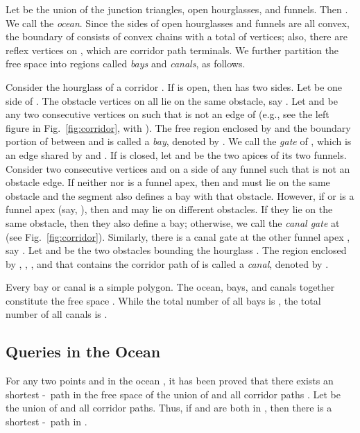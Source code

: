 \documentclass[english,runningheads,11pt]{llncs}
\def\st{-}
\begin{document}
Let  be the union of the  junction triangles, open
hourglasses, and funnels.  Then .
We call  the {\em ocean}.
Since the sides of open hourglasses and funnels
are all convex, the boundary
 of  consists of  convex chains with
a total of  vertices; also, there are  reflex vertices on ,
which are corridor path terminals.
We further partition the free space  into regions called {\em
bays} and {\em canals}, as follows.

Consider the hourglass  of a corridor .
If  is open, then 
has two sides. Let  be one side of .
The obstacle vertices on  all lie on the same
obstacle, say . Let  and  be any two consecutive
vertices on  such that  is
not an edge of  (e.g., see the left figure in
Fig.~\ref{fig:corridor}, with ). The free region enclosed
by  and the boundary portion of  between  and
 is called a {\em bay}, denoted by
. We call
 the {\em gate} of , which is
an edge shared by  and .
If  is closed, let  and  be the two apices
of its two funnels. Consider two consecutive vertices  and  on
a side of any funnel such that  is not an obstacle
edge. If neither  nor  is a funnel apex, then  and  must
lie on the same obstacle and the segment  also
defines a bay with that obstacle. However, if  or  is a funnel
apex (say, ), then  and  may lie on different obstacles.
If they lie on the same obstacle, then they also define a bay;
otherwise, we call  the {\em canal gate} at 
(see Fig.~\ref{fig:corridor}). Similarly, there is a canal gate
at the other funnel apex , say . Let  and
 be the two obstacles bounding the hourglass . The
region enclosed by , ,
, and  that contains the corridor path
of  is called a {\em canal}, denoted by .



Every bay or canal is a simple polygon.
The ocean, bays, and canals together
constitute the free space . While the
total number of all bays is , the total number of all canals is
.











\subsection{Queries in the Ocean }

For any two points  and  in the ocean , it has been
proved that there exists an  shortest \st\ path in the free space of the union of 
and all corridor paths \cite{ref:ChenA11ESA,ref:ChenCo12arXiv,ref:ChenL113STACS}.
Let  be the union of 
and all corridor paths. Thus, if  and  are both in , then there is a shortest \st\ path in .
\end{document}

